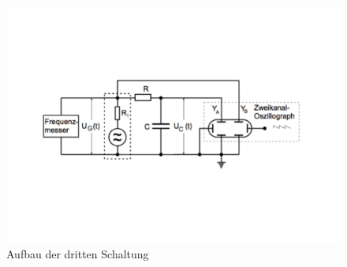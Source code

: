 \begin{figure}[h!]
  \centering
  \includegraphics[width=\textwidth]{Aufbau3.pdf}
  \caption{Aufbau der dritten Schaltung \cite{1}}
  \label{fig:Aufbau3}
\end{figure}
